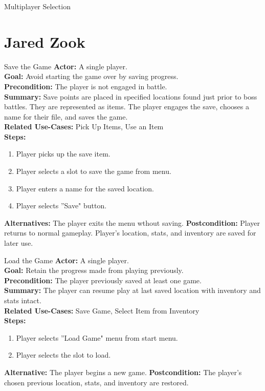 \documentclass[12pt]{report}
\begin{document}
\begin{subsection}{Multiplayer Selection}
\section{Jared Zook}

\begin{subsection}{Save the Game}
\textbf{Actor:} A single player. \\
\textbf{Goal:} Avoid starting the game over by saving progress. \\
\textbf{Precondition:} The player is not engaged in battle. \\
\textbf{Summary:} Save points are placed in specified locations found just prior to boss battles. They are represented as items. The player engages the save, chooses a name for their file, and saves the game.  \\
\textbf{Related Use-Cases:} Pick Up Items, Use an Item \\
\textbf{Steps:}
\begin{enumerate}
   \item Player picks up the save item.
   \item Player selects a slot to save the game from menu.
   \item Player enters a name for the saved location.
   \item Player selects ''Save" button.
\end{enumerate}
\textbf{Alternatives:} The player exits the menu wthout saving.
\textbf{Postcondition:} Player returns to normal gameplay. Player's location, stats, and inventory are saved for later use.
\end{subsection}

\begin{subsection}{Load the Game}
\textbf{Actor:} A single player. \\
\textbf{Goal:} Retain the progress made from playing previously. \\
\textbf{Precondition:} The player previously saved at least one game. \\
\textbf{Summary:} The player can resume play at last saved location with inventory and stats intact.  \\
\textbf{Related Use-Cases:} Save Game, Select Item from Inventory \\
\textbf{Steps:}
\begin{enumerate}
   \item Player selects ''Load Game" menu from start menu.
   \item Player selects the slot to load.
\end{enumerate}
\textbf{Alternative:} The player begins a new game.
\textbf{Postcondition:} The player's chosen previous location, stats, and inventory are restored.
\end{subsection}


\end{subsection}
\end{document}
